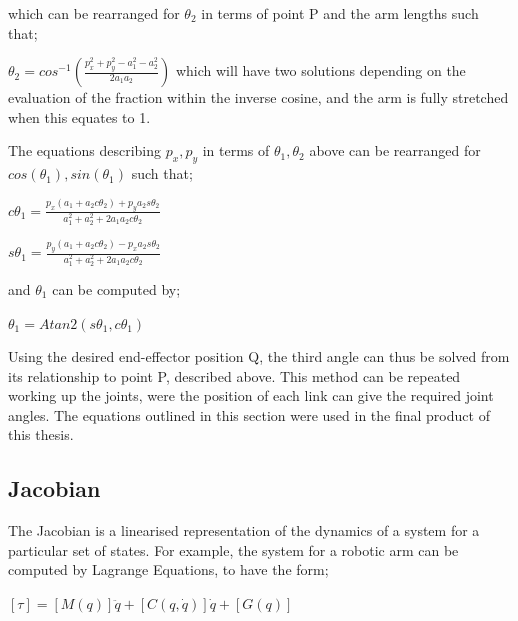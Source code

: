 \documentclass[12pt,openany,a4paper]{book}
\begin{document}
which can be rearranged for $\theta_2$ in terms of point P and the arm lengths such that;

$\theta_2 = cos^{-1} ( \frac{p_x^2 + p_y^2 - a_1^2 - a_2^2 }{2 a_1 a_2} )$
which will have two solutions depending on the evaluation of the fraction within the inverse cosine, and the arm is fully stretched when this equates to 1.

The equations describing $p_x, p_y$ in terms of $\theta_1, \theta_2$ above can be rearranged for $cos(\theta_1), sin(\theta_1)$ such that;

$c \theta_1 = \frac{p_x (a_1 + a_2 c \theta_2 ) + p_y a_2 s \theta_2}{a_1^2 + a_2^2 + 2 a_1 a_2 c \theta_2}$

$s \theta_1 = \frac{p_y (a_1 + a_2 c \theta_2 ) - p_x a_2 s \theta_2}{a_1^2 + a_2^2 + 2 a_1 a_2 c \theta_2}$

and $\theta_1$ can be computed by;

$\theta_1 = Atan2(s\theta_1, c\theta_1)$

Using the desired end-effector position Q, the third angle can thus be solved from its relationship to point P, described above. This method can be repeated working up the joints, were the position of each link can give the required joint angles. The equations outlined in this section were used in the final product of this thesis.


\subsection{Jacobian}
The Jacobian is a linearised representation of the dynamics of a system for a particular set of states. For example, the system for a robotic arm can be computed by Lagrange Equations, to have the form;

$[\tau] = [M(q)] \ddot{q} + [ C (q, \dot{q} ) ] \dot{q} + [G(q)]$
\end{document}
